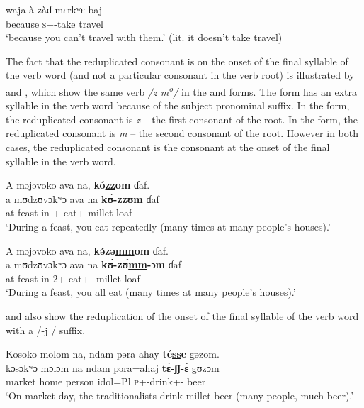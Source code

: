       \medskip
\gll waja à-zàɗ mɛrkʷɛ baj\\
     because  \textsc{s}+{\PFV}-take  travel  {\NEG}\\
\glt  ‘because you can’t travel with them.’ (lit. it doesn’t take travel)\\
\z 

The fact that the reduplicated consonant is on the onset of the final syllable of the verb word (and not a particular consonant in the verb root) is illustrated by  and , which show the same verb \textit{/z m\textsuperscript{o}/} in the {\twoS} and {\twoP} forms. The {\twoP} form has an extra syllable in the verb word because of the {\twoP} subject pronominal suffix. In the {\twoS} form, the reduplicated consonant is \textit{z} -- the first consonant of the root. In the {\twoP} form, the reduplicated consonant is \textit{m} -- the second consonant of the root. However in both cases, the reduplicated consonant is the consonant at the onset of the final syllable in the verb word.

\ea\label{ex:7:86}
A  məjəvoko  ava  na,  \textbf{kó\underline{zz}om} ɗaf.\\
\gll  a   mʊdzʊvɔkʷɔ  ava  na   \textbf{k\'ʊ-\underline{zz}ʊm}    ɗaf\\
      at   feast    in  {\PSP}  {\twoS}+{\IFV}-eat+{\ITR}    {millet loaf}\\
\glt  ‘During a feast, you eat repeatedly (many times at many people’s houses).’\\
\z 

\ea\label{ex:7:87}
A  məjəvoko  ava  na,  \textbf{k\'əzə\underline{mm}om}  ɗaf.\\
\gll  a   mʊdzʊvɔkʷɔ  ava  na   \textbf{k\'ʊ-z\'ʊ\underline{mm}{}-ɔm}     ɗaf\\
      at   feast     in   {\PSP}  2+{\IFV}{}-eat+{\ITR}{}-{\twoP}  {millet loaf}\\
\glt  ‘During a feast, you all eat (many times at many people’s houses).’\\ 
\z  

 and  also show the reduplication of the onset of the final syllable of the verb word with a /-j / suffix.

\ea\label{ex:7:88}
Kosoko  molom  na,  ndam  pəra  ahay  \textbf{té\underline{ss}e}  gəzom.\\
\gll  kɔsɔkʷɔ   mɔlɔm   na   ndam   pəra=ahaj   \textbf{t\'ɛ-\underline{ʃʃ}{}-\'ɛ }      gʊzɔm\\
      market  home  {\PSP}  person  idol=Pl  \textsc{p}+{\IFV}-drink+{\ITR}-{\CL}  beer\\
\glt  ‘On market day, the traditionalists drink millet beer (many people, much beer).’\\
\z 

